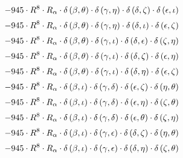 \begin{subequations}
\begin{gather}
 \\[0.2em] \notag 		 - 945 \cdot R^{8} \cdot R_{\alpha{}} \cdot \delta{}\left(\beta{}, \theta{}\right) \cdot \delta{}\left(\gamma{}, \eta{}\right) \cdot \delta{}\left(\delta{}, \zeta{}\right) \cdot \delta{}\left(\epsilon{}, \iota{}\right) 
 \\[0.2em] \notag 		 - 945 \cdot R^{8} \cdot R_{\alpha{}} \cdot \delta{}\left(\beta{}, \theta{}\right) \cdot \delta{}\left(\gamma{}, \eta{}\right) \cdot \delta{}\left(\delta{}, \iota{}\right) \cdot \delta{}\left(\epsilon{}, \zeta{}\right) 
 \\[0.2em] \notag 		 - 945 \cdot R^{8} \cdot R_{\alpha{}} \cdot \delta{}\left(\beta{}, \theta{}\right) \cdot \delta{}\left(\gamma{}, \iota{}\right) \cdot \delta{}\left(\delta{}, \epsilon{}\right) \cdot \delta{}\left(\zeta{}, \eta{}\right) 
 \\[0.2em] \notag 		 - 945 \cdot R^{8} \cdot R_{\alpha{}} \cdot \delta{}\left(\beta{}, \theta{}\right) \cdot \delta{}\left(\gamma{}, \iota{}\right) \cdot \delta{}\left(\delta{}, \zeta{}\right) \cdot \delta{}\left(\epsilon{}, \eta{}\right) 
 \\[0.2em] \notag 		 - 945 \cdot R^{8} \cdot R_{\alpha{}} \cdot \delta{}\left(\beta{}, \theta{}\right) \cdot \delta{}\left(\gamma{}, \iota{}\right) \cdot \delta{}\left(\delta{}, \eta{}\right) \cdot \delta{}\left(\epsilon{}, \zeta{}\right) 
 \\[0.2em] \notag 		 - 945 \cdot R^{8} \cdot R_{\alpha{}} \cdot \delta{}\left(\beta{}, \iota{}\right) \cdot \delta{}\left(\gamma{}, \delta{}\right) \cdot \delta{}\left(\epsilon{}, \zeta{}\right) \cdot \delta{}\left(\eta{}, \theta{}\right) 
 \\[0.2em] \notag 		 - 945 \cdot R^{8} \cdot R_{\alpha{}} \cdot \delta{}\left(\beta{}, \iota{}\right) \cdot \delta{}\left(\gamma{}, \delta{}\right) \cdot \delta{}\left(\epsilon{}, \eta{}\right) \cdot \delta{}\left(\zeta{}, \theta{}\right) 
 \\[0.2em] \notag 		 - 945 \cdot R^{8} \cdot R_{\alpha{}} \cdot \delta{}\left(\beta{}, \iota{}\right) \cdot \delta{}\left(\gamma{}, \delta{}\right) \cdot \delta{}\left(\epsilon{}, \theta{}\right) \cdot \delta{}\left(\zeta{}, \eta{}\right) 
 \\[0.2em] \notag 		 - 945 \cdot R^{8} \cdot R_{\alpha{}} \cdot \delta{}\left(\beta{}, \iota{}\right) \cdot \delta{}\left(\gamma{}, \epsilon{}\right) \cdot \delta{}\left(\delta{}, \zeta{}\right) \cdot \delta{}\left(\eta{}, \theta{}\right) 
 \\[0.2em] \notag 		 - 945 \cdot R^{8} \cdot R_{\alpha{}} \cdot \delta{}\left(\beta{}, \iota{}\right) \cdot \delta{}\left(\gamma{}, \epsilon{}\right) \cdot \delta{}\left(\delta{}, \eta{}\right) \cdot \delta{}\left(\zeta{}, \theta{}\right) 

\end{gather}
\end{subequations}
